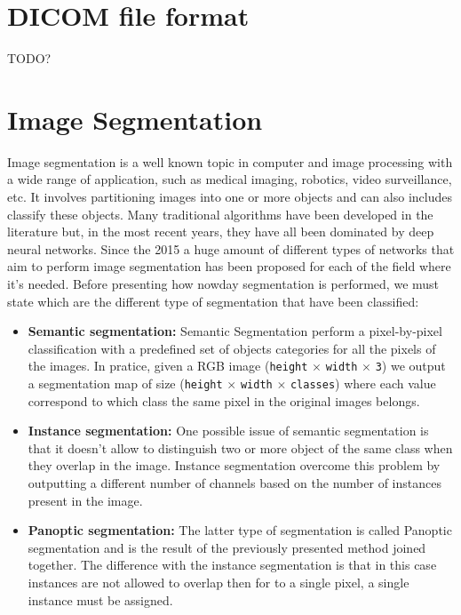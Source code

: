 \section{DICOM file format}
TODO?

\section{Image Segmentation}
Image segmentation is a well known topic in computer and image processing with a
wide range of application, such as medical imaging, robotics, video
surveillance, etc.
It involves partitioning images into one or more objects and can also includes
classify these objects. Many traditional algorithms have been developed in the
literature but, in the most recent years, they have all been dominated by deep
neural networks. Since the 2015 a huge amount of different types of networks
that aim to perform image segmentation has been proposed for each of the field
where it's needed.
Before presenting how nowday segmentation is performed, we must state which are
the different type of segmentation that have been classified:

\begin{itemize}
  \item{\textbf{Semantic segmentation:}
  Semantic Segmentation perform a pixel-by-pixel classification with a predefined
  set of objects categories for all the pixels of the images. In pratice, given a
  RGB image (\texttt{height} $\times$ \texttt{width} $\times$ \texttt{3}) we output
  a segmentation map of size (\texttt{height} $\times$ \texttt{width} $\times$
  \texttt{classes}) where each value correspond to which class the same pixel in the
  original images belongs.}

  \item{\textbf{Instance segmentation:}
  One possible issue of semantic segmentation is that it doesn't allow to
  distinguish two or more object of the same class when they overlap in the image.
  Instance segmentation overcome this problem by outputting a different number of
  channels based on the number of instances present in the image.}

  \item{\textbf{Panoptic segmentation:}
  The latter type of segmentation is called Panoptic segmentation and is the
  result of the previously presented method joined together. The difference with
  the instance segmentation is that in this case instances are not allowed to
  overlap then for to a single pixel, a single instance must be assigned.}
\end{itemize}

